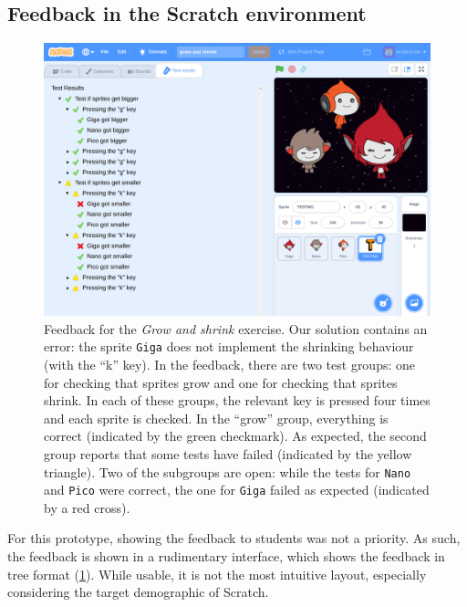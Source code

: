 \documentclass[../main]{subfiles}
\begin{document}
\subsection{Feedback in the Scratch environment}\label{subsec:feedback-in-the-scratch-environment}

\begin{figure}
    \begin{wide}
        \includegraphics[width=\linewidth]{scratch-poke-feedback}
    \end{wide}
    \caption{
        Feedback for the \emph{Grow and shrink} exercise.
        Our solution contains an error: the sprite \texttt{Giga} does not implement the shrinking behaviour (with the ``k'' key).
        In the feedback, there are two test groups: one for checking that sprites grow and one for checking that sprites shrink.
        In each of these groups, the relevant key is pressed four times and each sprite is checked.
        In the ``grow'' group, everything is correct (indicated by the green checkmark).
        As expected, the second group reports that some tests have failed (indicated by the yellow triangle).
        Two of the subgroups are open: while the tests for \texttt{Nano} and \texttt{Pico} were correct, the one for \texttt{Giga} failed as expected (indicated by a red cross).
    }
    \label{fig:poke-feedback-result}
\end{figure}

For this prototype, showing the feedback to students was not a priority.
As such, the feedback is shown in a rudimentary interface, which shows the feedback in tree format (\cref{fig:poke-feedback-result}).
While usable, it is not the most intuitive layout, especially considering the target demographic of Scratch.
\end{document}
